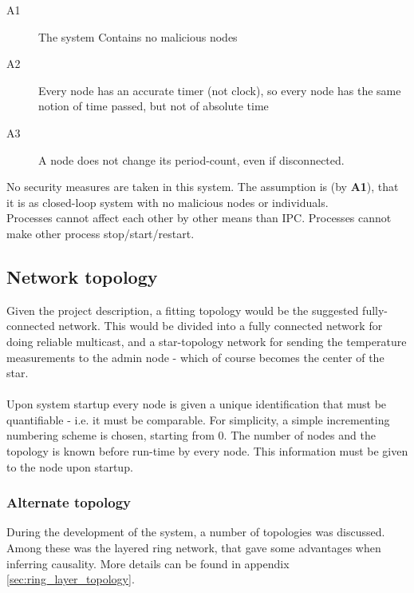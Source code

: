 \documentclass[10pt,a4paper]{article}
\begin{document}
\begin{description}
 \item[A1] The system Contains no malicious nodes
 \item[A2] Every node has an accurate timer (not clock), so every node has the same notion of time passed, but not of absolute time
 \item[A3] A node does not change its period-count, even if disconnected.
\end{description} 
No security measures are taken in this system. The assumption is (by \textbf{A1}), that it is as closed-loop system with no malicious nodes or individuals.\\
Processes cannot affect each other by other means than IPC. Processes cannot make other process stop/start/restart.

\subsection{Network topology}
Given the project description, a fitting topology would be the suggested fully-connected network. This would be divided into a fully connected network for doing reliable multicast, and a star-topology network for sending the temperature measurements to the admin node - which of course becomes the center of the star.\\\\
Upon system startup every node is given a unique identification that must be quantifiable - i.e. it must be comparable. For simplicity, a simple incrementing numbering scheme is chosen, starting from 0. The number of nodes and the topology is known before run-time by every node. This information must be given to the node upon startup.

\subsubsection{Alternate topology}
During the development of the system, a number of topologies was discussed. Among these was the layered ring network, that gave some advantages when inferring causality. More details can be found in appendix \ref{sec:ring_layer_topology}.
\end{document}

